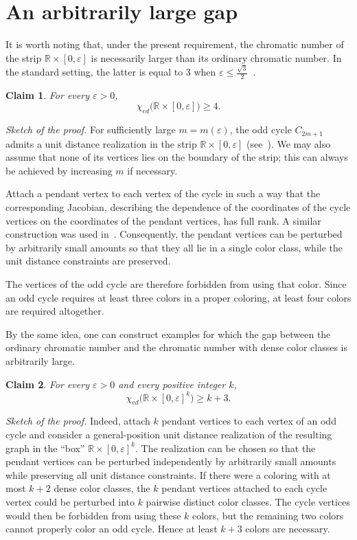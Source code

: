 \documentclass[12pt,a4paper]{article}
\newtheorem{claim}{Claim}
\begin{document}
\section{An arbitrarily large gap}

It is worth noting that, under the present requirement, the chromatic
number of the strip $\mathbb{R}\times[0,\varepsilon]$ is necessarily larger
than its ordinary chromatic number. In the standard setting, the latter is
equal to $3$ when $\varepsilon\leq\frac{\sqrt{3}}{2}$~\cite{bauslaugh1998tearing}.

\begin{claim}
    For every $\varepsilon>0$,
    \[
        \chi_{ed}\bigl(\mathbb{R}\times[0,\varepsilon]\bigr)\geq 4.
    \]
\end{claim}

\medskip
\emph{Sketch of the proof.} For sufficiently large $m=m(\varepsilon)$, the odd cycle
$C_{2m+1}$ admits a unit distance realization in the strip
$\mathbb{R}\times[0,\varepsilon]$ (see~\cite{bauslaugh1998tearing}). We may also
assume that none of its vertices lies on the boundary of the strip; this
can always be achieved by increasing $m$ if necessary.

Attach a pendant vertex to each vertex of the cycle in such a way that the
corresponding Jacobian, describing the dependence of the coordinates of the
cycle vertices on the coordinates of the pendant vertices, has full rank.
A similar construction was used in~\cite{DCGspheres}. Consequently, the
pendant vertices can be perturbed by arbitrarily small amounts so that they
all lie in a single color class, while the unit distance constraints are
preserved.

The vertices of the odd cycle are therefore forbidden from using that
color. Since an odd cycle requires at least three colors in a proper
coloring, at least four colors are required altogether.

\medskip

By the same idea, one can construct examples for which the gap between the
ordinary chromatic number and the chromatic number with dense
color classes is arbitrarily large.

\begin{claim}
    For every $\varepsilon>0$ and every positive integer $k$,
    \[
        \chi_{ed}\bigl(\mathbb{R}\times[0,\varepsilon]^k\bigr)\geq k+3.
    \]
\end{claim}

\medskip
\emph{Sketch of the proof.}  Indeed, attach $k$ pendant vertices to each vertex of an odd cycle and
consider a general-position unit distance realization of the resulting
graph in the ``box'' $\mathbb{R}\times[0,\varepsilon]^k$.
The realization can be chosen so that the pendant vertices can be perturbed
independently by arbitrarily small amounts while preserving all
unit distance constraints. If there were a coloring with at most $k+2$
dense color classes, the $k$ pendant vertices attached to each
cycle vertex could be perturbed into $k$ pairwise distinct color classes.
The cycle vertices would then be forbidden from using these $k$ colors, but
the remaining two colors cannot properly color an odd cycle. Hence at least
$k+3$ colors are necessary.
\end{document}

